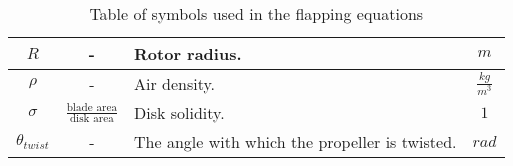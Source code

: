 \begin{table}
\begin{tabularx}{\tablewidth}{|c|c|X|c|}
            $R$ & - & Rotor radius.   & $m$ \\\hline
            $\rho$ & - & Air density.   & $\frac{kg}{m^{3}}$ \\\hline
            $\sigma$ & $\frac{\text{blade area}}{\text{disk area}}$ & Disk solidity. & $1$ \\\hline
            $\theta_{twist}$ & - & The angle with which the propeller is twisted.  & $rad$ \\\hline
        \end{tabularx}
        \label{tbl:observer:flapping:symbols}
        \caption{Table of symbols used in the flapping equations}
    \end{table}
